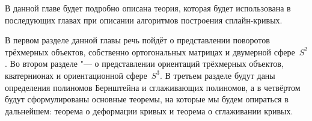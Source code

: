 В данной главе будет подробно описана теория, которая будет использована в последующих главах при описании алгоритмов
построения сплайн-кривых.

В первом разделе данной главы речь пойдёт о представлении поворотов трёхмерных объектов, собственно ортогональных
матрицах и двумерной сфере~$S^2$. Во втором разделе "--- о представлении ориентаций трёхмерных объектов, кватернионах
и ориентационной сфере~$S^3$. В третьем разделе будут даны определения полиномов Бернштейна и сглаживающих полиномов,
а в четвёртом будут сформулированы основные теоремы, на которые мы будем опираться в дальнейшем: теорема о деформации
кривых и теорема о сглаживании кривых.
